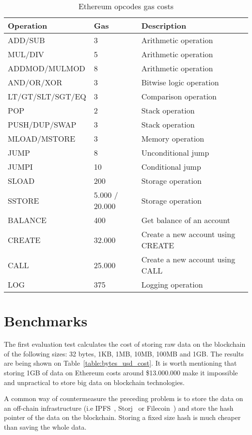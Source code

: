 \begin{table}[!ht]
\centering
\begin{tabular}{|l|l|l|}
\hline
 Operation & Gas  & Description \\ \hline
 ADD/SUB & 3 & Arithmetic operation \\ \hline
 MUL/DIV & 5 & Arithmetic operation \\ \hline
 ADDMOD/MULMOD & 8 & Arithmetic operation \\ \hline
 AND/OR/XOR & 3 & Bitwise logic operation \\ \hline
 LT/GT/SLT/SGT/EQ & 3 & Comparison operation \\ \hline
 POP & 2 & Stack operation \\ \hline
 PUSH/DUP/SWAP & 3 & Stack operation \\ \hline
 MLOAD/MSTORE & 3 & Memory operation \\ \hline
 JUMP & 8 & Unconditional jump \\ \hline
 JUMPI & 10 & Conditional jump \\ \hline
 SLOAD & 200 & Storage operation \\ \hline
 SSTORE & 5.000 / 20.000 & Storage operation \\ \hline
 BALANCE & 400 & Get balance of an account \\ \hline
 CREATE & 32.000 & Create a new account using CREATE \\ \hline
 CALL & 25.000 & Create a new account using CALL \\ \hline
 LOG & 375 & Logging operation \\ \hline
\end{tabular}
\caption{Ethereum opcodes gas costs}
\label{table:opcode_gas_cost}
\end{table}

\section{Benchmarks}
\label{evaluation:benchmarks}

The first evaluation test calculates the cost of storing raw data on the blockchain of the following sizes: 32 bytes, 1KB, 1MB, 10MB, 100MB and 1GB. The results are being shown on Table~\ref{table:bytes_usd_cost}. It is worth mentioning that storing 1GB of data on Ethereum costs around \$13.000.000 make it impossible and unpractical to store big data on blockchain technologies.

A common way of countermeasure the preceding problem is to store the data on an off-chain infrastructure (i.e IPFS~\cite{ipfs}, Storj~\cite{storj} or Filecoin~\cite{filecoin}) and store the hash pointer of the data on the blockchain. Storing a fixed size hash is much cheaper than saving the whole data.

